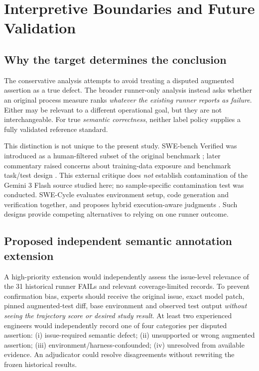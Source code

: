\section{Interpretive Boundaries and Future Validation}\label{sec:interp}
\subsection{Why the target determines the conclusion}
The conservative analysis attempts to avoid treating a disputed augmented assertion as a true defect. The broader runner-only analysis instead asks whether an original process measure ranks \emph{whatever the existing runner reports as failure}. Either may be relevant to a different operational goal, but they are not interchangeable. For true \emph{semantic correctness}, neither label policy supplies a fully validated reference standard.

This distinction is not unique to the present study. SWE-bench Verified was introduced as a human-filtered subset of the original benchmark \cite{openai2024verified}; later commentary raised concerns about training-data exposure and benchmark task/test design \cite{openai2026benchmark}. This external critique does \emph{not} establish contamination of the Gemini 3 Flash source studied here; no sample-specific contamination test was conducted. SWE-Cycle evaluates environment setup, code generation and verification together, and proposes hybrid execution-aware judgments \cite{guan2026swecycle}. Such designs provide competing alternatives to relying on one runner outcome.

\subsection{Proposed independent semantic annotation extension}
A high-priority extension would independently assess the issue-level relevance of the 31 historical runner FAILs and relevant coverage-limited records. To prevent confirmation bias, experts should receive the original issue, exact model patch, pinned augmented-test diff, base environment and observed test output \emph{without seeing the trajectory score or desired study result}. At least two experienced engineers would independently record one of four categories per disputed assertion: (i) issue-required semantic defect; (ii) unsupported or wrong augmented assertion; (iii) environment/harness-confounded; (iv) unresolved from available evidence. An adjudicator could resolve disagreements without rewriting the frozen historical results.

